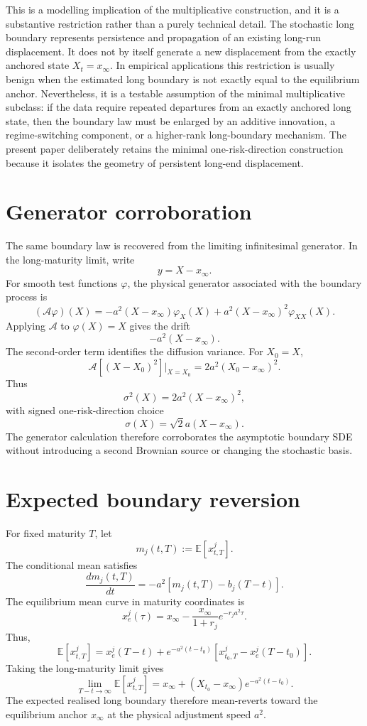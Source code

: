 \documentclass[11pt]{article}
\begin{document}
This is a modelling implication of the multiplicative construction, and it is a substantive restriction rather than a purely technical detail. The stochastic long boundary represents persistence and propagation of an existing long-run displacement. It does not by itself generate a new displacement from the exactly anchored state \(X_t=x_\infty\). In empirical applications this restriction is usually benign when the estimated long boundary is not exactly equal to the equilibrium anchor. Nevertheless, it is a testable assumption of the minimal multiplicative subclass: if the data require repeated departures from an exactly anchored long state, then the boundary law must be enlarged by an additive innovation, a regime-switching component, or a higher-rank long-boundary mechanism. The present paper deliberately retains the minimal one-risk-direction construction because it isolates the geometry of persistent long-end displacement.

\section{Generator corroboration}

The same boundary law is recovered from the limiting infinitesimal generator. In the long-maturity limit, write
\[
y=X-x_\infty.
\]
For smooth test functions \(\varphi\), the physical generator associated with the boundary process is
\[
(\mathcal A\varphi)(X)
=
-a^2(X-x_\infty)\varphi_X(X)
+
a^2(X-x_\infty)^2\varphi_{XX}(X).
\]
Applying \(\mathcal A\) to \(\varphi(X)=X\) gives the drift
\[
-a^2(X-x_\infty).
\]
The second-order term identifies the diffusion variance. For \(X_0=X\),
\[
\mathcal A\left[(X-X_0)^2\right]\bigg|_{X=X_0}
=
2a^2(X_0-x_\infty)^2.
\]
Thus
\[
\sigma^2(X)
=
2a^2(X-x_\infty)^2,
\]
with signed one-risk-direction choice
\[
\sigma(X)
=
\sqrt{2}a(X-x_\infty).
\]
The generator calculation therefore corroborates the asymptotic boundary SDE without introducing a second Brownian source or changing the stochastic basis.

\section{Expected boundary reversion}

For fixed maturity \(T\), let
\[
m_j(t,T):=\mathbb E[x^j_{t,T}].
\]
The conditional mean satisfies
\[
\frac{d m_j(t,T)}{dt}
=
-a^2\left[m_j(t,T)-b_j(T-t)\right].
\]
The equilibrium mean curve in maturity coordinates is
\[
x^j_e(\tau)
=
x_\infty
-
\frac{x_\infty}{1+r_j}e^{-r_j a^2\tau}.
\]
Thus,
\[
\mathbb E[x^j_{t,T}]
=
x^j_e(T-t)
+
e^{-a^2(t-t_0)}
\left[
x^j_{t_0,T}
-
x^j_e(T-t_0)
\right].
\]
Taking the long-maturity limit gives
\[
\lim_{T-t\to\infty}\mathbb E[x^j_{t,T}]
=
x_\infty
+
(X_{t_0}-x_\infty)e^{-a^2(t-t_0)}.
\]
The expected realised long boundary therefore mean-reverts toward the equilibrium anchor \(x_\infty\) at the physical adjustment speed \(a^2\).
\end{document}
